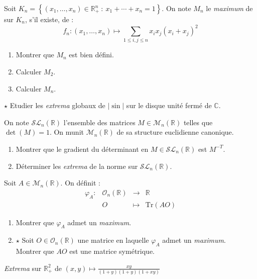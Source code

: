 \documentclass[french,a4paper]{article}
\newcommand{\R}{\mathbb{R}}
\newcommand{\C}{\mathbb{C}}
\newcommand{\Tr}{\text{Tr}}
\theoremstyle{plain}
\theoremstyle{definition}
\theoremstyle{remark}
\begin{document}
\begin{ex}[Moulin.46]{}
	Soit $K_n=\left\{(x_1,\ldots,x_n)\in\R_+^n\ : \ x_1+\cdots+x_n=1\right\}$. On note $M_n$ le \textit{maximum} de sur $K_n$, s'il existe, de : $$f_n:(x_1,\ldots,x_n)\mapsto\sum_{1\leqslant i,j\leqslant n}x_ix_j(x_i+x_j)^2$$
	\begin{enumerate}
		\item Montrer que $M_n$ est bien défini.
		\item Calculer $M_2$. 
		\item Calculer $M_n$.
	\end{enumerate}
\end{ex}

\begin{ex}[Moulin.47]{$\star$}
	Etudier les \textit{extrema} globaux de $\lvert \sin\rvert$ sur le disque unité fermé de $\C$.
\end{ex}

\begin{ex}[Moulin.48]{}
	On note $\mathcal{SL}_n(\R)$ l'ensemble des matrices $M\in\mathcal{M}_n(\R)$ telles que $\det(M)=1$. On munit $\mathcal{M}_n(\R)$ de sa structure euclidienne canonique.
	\begin{enumerate}
		\item Montrer que le gradient du déterminant en $M\in\mathcal{SL}_n(\R)$ est $M^{-T}$.
		\item Déterminer les \textit{extrema} de la norme sur $\mathcal{SL}_n(\R)$.
	\end{enumerate}
\end{ex}

\begin{ex}[Moulin.49]{}
	Soit $A\in\mathcal{M}_n(\R)$. On définit : $$\begin{array}{lrcl}
		\varphi_A:&\mathcal{O}_n(\R)&\longrightarrow&\R\\
		&O&\longmapsto&\Tr(AO)
	\end{array}$$
	\begin{enumerate}
		\item Montrer que $\varphi_A$ admet un \textit{maximum}.
		\item $\star$ Soit $O\in\mathcal{O}_n(\R)$ une matrice en laquelle $\varphi_A$ admet un \textit{maximum}. \\ Montrer que $AO$ est une matrice symétrique.
	\end{enumerate}
\end{ex}

\begin{ex}[Moulin.50]{}
	\textit{Extrema} sur $\R_+^2$ de $(x,y)\mapsto\displaystyle\frac{xy}{(1+y)(1+y)(1+xy)}$
\end{ex}
\end{document}

